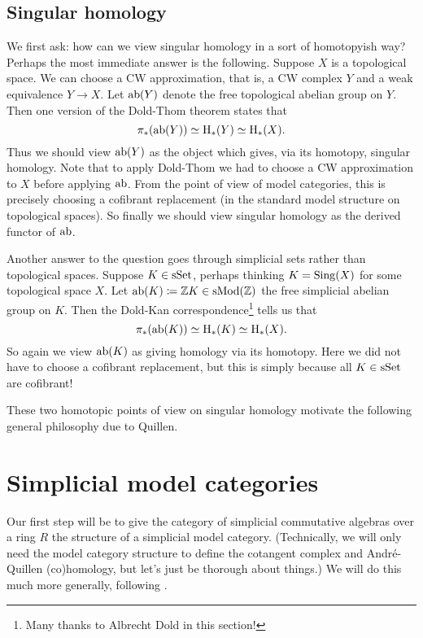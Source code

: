 \subsection{Singular homology}

We first ask: how can we view singular homology in a sort of
homotopyish way? Perhaps the most immediate answer is the
following. Suppose $X$ is a topological space. We can choose a CW
approximation, that is, a CW complex $Y$ and a weak equivalence $Y \to
X$. Let $\operatorname{ab}(Y)$ denote the free topological abelian group on
$Y$. Then one version of the Dold-Thom theorem \cite{mccord-doldthom}
states that
\[
\pi_*(\operatorname{ab}(Y)) \simeq \mathrm{H}_*(Y) \simeq \mathrm{H}_*(X).
\]
Thus we should view $\operatorname{ab}(Y)$ as the object which gives, via its
homotopy, singular homology. Note that to apply Dold-Thom we had to
choose a CW approximation to $X$ before applying $\operatorname{ab}$. From the point
of view of model categories, this is precisely choosing a cofibrant
replacement (in the standard model structure on topological
spaces). So finally we should view singular homology as the derived
functor of $\operatorname{ab}$.

Another answer to the question goes through simplicial sets rather
than topological spaces. Suppose $K \in \mathrm{s}\mathrm{Set}$, perhaps thinking $K =
\operatorname{Sing}(X)$ for some topological space $X$. Let $\operatorname{ab}(K) \coloneqq \mathbb{Z}
K\in \mathrm{s}\mathrm{Mod}(\mathbb{Z})$ the free simplicial abelian group on $K$.  Then the
Dold-Kan correspondence\footnote{Many thanks to Albrecht Dold in this
  section!} tells us that
\[
\pi_*(\operatorname{ab}(K)) \simeq \mathrm{H}_*(K) \simeq \mathrm{H}_*(X).
\]
So again we view $\operatorname{ab}(K)$ as giving homology via its homotopy. Here we
did not have to choose a cofibrant replacement, but this is simply
because all $K \in \mathrm{s}\mathrm{Set}$ are cofibrant!

These two homotopic points of view on singular homology motivate the
following general philosophy due to Quillen.


\section{Simplicial model categories}

Our first step will be to give the category of simplicial commutative
algebras over a ring $R$ the structure of a simplicial model
category. (Technically, we will only need the model category structure
to define the cotangent complex and Andr\'e-Quillen (co)homology, but
let's just be thorough about things.) We will do this much more
generally, following \cite[Ch. II]{goerssjardine}.

